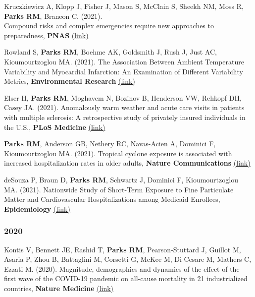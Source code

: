{\noindent Kruczkiewicz A, Klopp J, Fisher J, Mason S, McClain S, Sheekh NM, Moss R, \textbf{Parks RM}, Braneon C. (2021).\\Compound risks and complex emergencies require new approaches to preparedness, \textbf{PNAS} \href{https://www.pnas.org/content/118/19/e2106795118}{(link)} \smallskip

\noindent Rowland S, \textbf{Parks RM}, Boehme AK, Goldsmith J, Rush J, Just AC, Kioumourtzoglou MA. (2021). The Association Between Ambient Temperature Variability and Myocardial Infarction: An Examination of Different Variability Metrics, \textbf{Environmental Research} \href{https://www.sciencedirect.com/science/article/pii/S0013935121005016}{(link)} \smallskip

\noindent Elser H, \textbf{Parks RM}, Moghavem N, Bozinov B, Henderson VW, Rehkopf DH, Casey JA. (2021). Anomalously warm weather and acute care visits in patients with multiple sclerosis: A retrospective study of privately insured individuals in the U.S., \textbf{PLoS Medicine} \href{https://journals.plos.org/plosmedicine/article?id=10.1371/journal.pmed.1003580}{(link)} \smallskip

\noindent \textbf{Parks RM}, Anderson GB, Nethery RC, Navas-Acien A, Dominici F, Kioumourtzoglou MA. (2021). Tropical cyclone exposure is associated with increased hospitalization rates in older adults, \textbf{Nature Communications} \href{https://www.nature.com/articles/s41467-021-21777-1}{(link)} \smallskip

\noindent deSouza P, Braun D, \textbf{Parks RM}, Schwartz J, Dominici F, Kioumourtzoglou MA. (2021). Nationwide Study of Short-Term Exposure to Fine Particulate Matter and Cardiovascular Hospitalizations among Medicaid Enrollees, \textbf{Epidemiology} \href{https://journals.lww.com/epidem/Abstract/2021/01000/Nationwide_Study_of_Short_term_Exposure_to_Fine.2.aspx}{(link)}

\subsubsection*{2020}

\noindent Kontis V, Bennett JE, Rashid T, \textbf{Parks RM}, Pearson-Stuttard J, Guillot M, Asaria P, Zhou B, Battaglini M, Corsetti G, McKee M, Di Cesare M, Mathers C, Ezzati M. (2020). Magnitude, demographics and dynamics of the effect of the first wave of the COVID-19 pandemic on all-cause mortality in 21 industrialized countries, \textbf{Nature Medicine} \href{https://doi.org/10.1038/s41591-020-1112-0}{(link)} \smallskip

}
